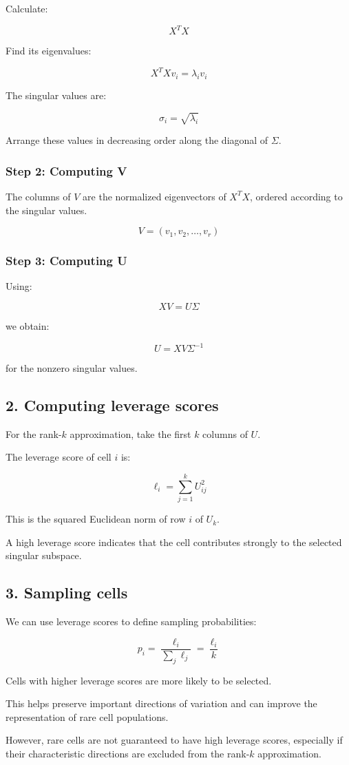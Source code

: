 \documentclass[
]{article}
\begin{document}
Calculate:

\[
X^TX
\]

Find its eigenvalues:

\[
X^TXv_i=\lambda_i v_i
\]

The singular values are:

\[
\boxed{\sigma_i=\sqrt{\lambda_i}}
\]

Arrange these values in decreasing order along the diagonal of
\(\Sigma\).

\subsubsection{Step 2: Computing V}\label{step-2-computing-v}

The columns of \(V\) are the normalized eigenvectors of \(X^TX\),
ordered according to the singular values.

\[
V=(v_1,v_2,\ldots,v_r)
\]

\subsubsection{Step 3: Computing U}\label{step-3-computing-u}

Using:

\[
XV=U\Sigma
\]

we obtain:

\[
\boxed{U=XV\Sigma^{-1}}
\]

for the nonzero singular values.

\subsection{2. Computing leverage
scores}\label{computing-leverage-scores}

For the rank-\(k\) approximation, take the first \(k\) columns of \(U\).

The leverage score of cell \(i\) is:

\[
\boxed{\ell_i=\sum_{j=1}^{k}U_{ij}^{2}}
\]

This is the squared Euclidean norm of row \(i\) of \(U_k\).

A high leverage score indicates that the cell contributes strongly to
the selected singular subspace.

\subsection{3. Sampling cells}\label{sampling-cells}

We can use leverage scores to define sampling probabilities:

\[
\boxed{p_i=\frac{\ell_i}{\sum_j \ell_j}=\frac{\ell_i}{k}}
\]

Cells with higher leverage scores are more likely to be selected.

This helps preserve important directions of variation and can improve
the representation of rare cell populations.

However, rare cells are not guaranteed to have high leverage scores,
especially if their characteristic directions are excluded from the
rank-\(k\) approximation.
\end{document}
